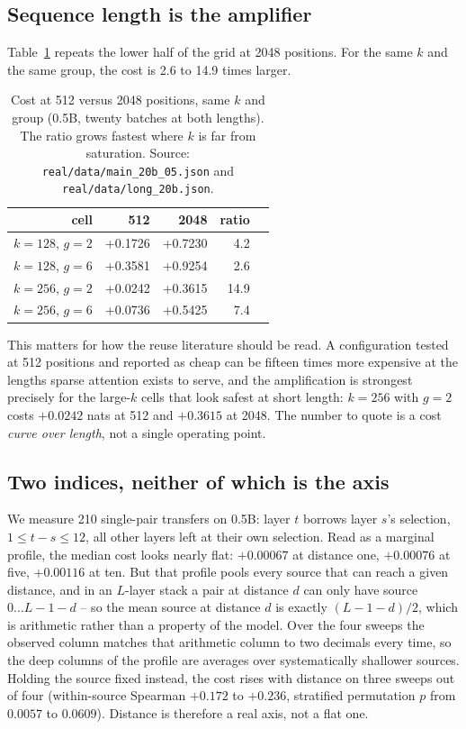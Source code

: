 \documentclass[10pt]{article}
\begin{document}
\subsection{Sequence length is the amplifier}

Table~\ref{tab:long} repeats the lower half of the grid at 2048 positions.
For the same $k$ and the same group, the cost is 2.6 to 14.9 times larger.

\begin{table}[h]
\centering
\caption{Cost at 512 versus 2048 positions, same $k$ and group (0.5B,
twenty batches at both lengths). The ratio grows fastest where $k$ is far
from saturation. Source: \texttt{real/data/main\_20b\_05.json} and
\texttt{real/data/long\_20b.json}.}
\label{tab:long}
\begin{tabular}{rrrrr}
\toprule
cell & 512 & 2048 & ratio \\
\midrule
$k{=}128$, $g{=}2$ & +0.1726 & +0.7230 & 4.2 \\
$k{=}128$, $g{=}6$ & +0.3581 & +0.9254 & 2.6 \\
$k{=}256$, $g{=}2$ & +0.0242 & +0.3615 & 14.9 \\
$k{=}256$, $g{=}6$ & +0.0736 & +0.5425 & 7.4 \\
\bottomrule
\end{tabular}
\end{table}

This matters for how the reuse literature should be read. A configuration
tested at 512 positions and reported as cheap can be fifteen times more
expensive at the lengths sparse attention exists to serve, and the
amplification is strongest precisely for the large-$k$ cells that look
safest at short length: $k{=}256$ with $g{=}2$ costs $+0.0242$ nats at 512
and $+0.3615$ at 2048. The number to quote is a cost \emph{curve over
length}, not a single operating point.

\subsection{Two indices, neither of which is the axis}
\label{sec:leader}

We measure 210 single-pair transfers on 0.5B: layer $t$ borrows layer
$s$'s selection, $1 \le t - s \le 12$, all other layers left at their own
selection. Read as a marginal profile, the median cost looks nearly flat:
$+0.00067$ at distance one, $+0.00076$ at five, $+0.00116$ at ten. But that
profile pools every source that can reach a given distance, and in an
$L$-layer stack a pair at distance $d$ can only have source
$0 \ldots L-1-d$ -- so the mean source at distance $d$ is exactly
$(L-1-d)/2$, which is arithmetic rather than a property of the model. Over
the four sweeps the observed column matches that arithmetic column to two
decimals every time, so the deep columns of the profile are averages over
systematically shallower sources. Holding the source fixed instead, the cost
rises with distance on three sweeps out of four (within-source Spearman
$+0.172$ to $+0.236$, stratified permutation $p$ from $0.0057$ to $0.0609$).
Distance is therefore a real axis, not a flat one.
\end{document}
